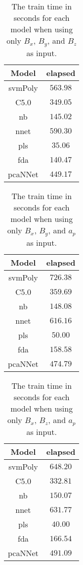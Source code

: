 \begin{table}[!ht]
	\centering
	\begin{tabular}{|c|c|}
		\hline
		Model & elapsed \\ \hline
		svmPoly & $563.98$ \\ \hline
		C5.0 & $349.05$ \\ \hline
		nb & $145.02$ \\ \hline
		nnet & $590.30$ \\ \hline
		pls & $35.06$ \\ \hline
		fda & $140.47$ \\ \hline
		pcaNNet & $449.17$ \\ \hline
	\end{tabular}
	\caption{The train time in seconds for each model when using only $B_{x}$, $B_{y}$, and $B_{z}$ as input.}
	\label{tab:time:coord:train}
\end{table}

\begin{table}[!ht]
	\centering
	\begin{tabular}{|c|c|}
		\hline
		Model & elapsed \\ \hline
		svmPoly & $726.38$ \\ \hline
		C5.0 & $359.69$ \\ \hline
		nb & $148.08$ \\ \hline
		nnet & $616.16$ \\ \hline
		pls & $50.00$ \\ \hline
		fda & $158.58$ \\ \hline
		pcaNNet & $474.79$ \\ \hline
	\end{tabular}
	\caption{The train time in seconds for each model when using only $B_{x}$, $B_{y}$, and $a_{p}$ as input.}
	\label{tab:time:xyap:train}
\end{table}

\begin{table}[!ht]
	\centering
	\begin{tabular}{|c|c|}
		\hline
		Model & elapsed \\ \hline
		svmPoly & $648.20$ \\ \hline
		C5.0 & $332.81$ \\ \hline
		nb & $150.07$ \\ \hline
		nnet & $631.77$ \\ \hline
		pls & $40.00$ \\ \hline
		fda & $166.54$ \\ \hline
		pcaNNet & $491.09$ \\ \hline
	\end{tabular}
	\caption{The train time in seconds for each model when using only $B_{x}$, $B_{z}$, and $a_{p}$ as input.}
	\label{tab:time:xzap:train}
\end{table}

